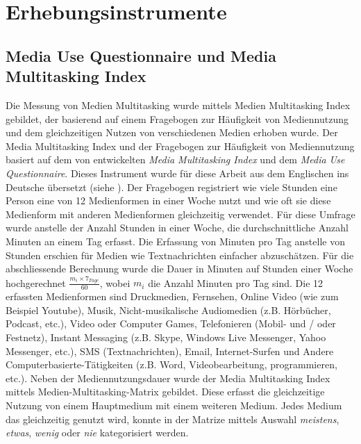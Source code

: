 \section{Erhebungsinstrumente}\label{section.erhebungsinstrumente}
\subsection{Media Use Questionnaire und Media Multitasking Index}\label{subsection.muq}
Die Messung von Medien Multitasking wurde mittels Medien Multitasking Index gebildet, der basierend auf einem Fragebogen zur Häufigkeit von Mediennutzung und dem gleichzeitigen Nutzen von verschiedenen Medien erhoben wurde. Der Media Multitasking Index und der Fragebogen zur Häufigkeit von Mediennutzung basiert auf dem von  entwickelten \textit{Media Multitasking Index} und dem \textit{Media Use Questionnaire}. Dieses Instrument wurde für diese Arbeit aus dem Englischen ins Deutsche übersetzt (siehe ). Der Fragebogen registriert wie viele Stunden eine Person eine von 12 Medienformen in einer Woche nutzt und wie oft sie diese Medienform mit anderen Medienformen gleichzeitig verwendet. Für diese Umfrage wurde anstelle der Anzahl Stunden in einer Woche, die durchschnittliche Anzahl Minuten an einem Tag erfasst. Die Erfassung von Minuten pro Tag anstelle von Stunden erschien für Medien wie Textnachrichten einfacher abzuschätzen. Für die abschliessende Berechnung wurde die Dauer in Minuten auf Stunden einer Woche hochgerechnet \(\frac{m_{i} \times 7_{Tage}}{60}\), wobei \(m_{i}\) die Anzahl Minuten pro Tag sind. Die 12 erfassten Medienformen sind Druckmedien, Fernsehen, Online Video (wie zum Beispiel Youtube), Musik, Nicht-musikalische Audiomedien (z.B. Hörbücher, Podcast, etc.), Video oder Computer Games, Telefonieren (Mobil- und / oder Festnetz), Instant Messaging (z.B. Skype, Windows Live Messenger, Yahoo Messenger, etc.), SMS (Textnachrichten), Email, Internet-Surfen und Andere Computerbasierte-Tätigkeiten (z.B. Word, Videobearbeitung, programmieren, etc.). Neben der Mediennutzungsdauer wurde der Media Multitasking Index mittels Medien-Multitasking-Matrix gebildet. Diese erfasst die gleichzeitige Nutzung von einem Hauptmedium mit einem weiteren Medium. Jedes Medium das gleichzeitig genutzt wird, konnte in der Matrize mittels Auswahl \textit{meistens}, \textit{etwas}, \textit{wenig} oder \textit{nie} kategorisiert werden.\\
  
